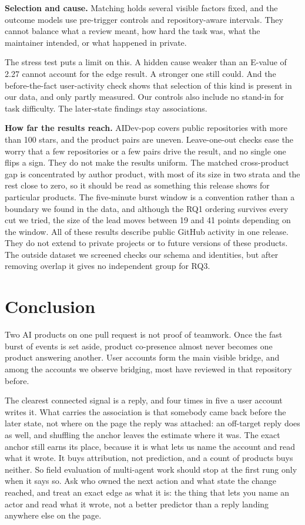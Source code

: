\documentclass[lineno,pdflatex,sn-basic]{sn-jnl}
\begin{document}
\textbf{Selection and cause.} Matching holds several visible factors fixed, and
the outcome models use pre-trigger controls and repository-aware intervals.
They cannot balance what a review meant, how hard the task was, what the
maintainer intended, or what happened in private.

The stress test puts a limit on this. A hidden cause weaker than an E-value of
2.27 cannot account for the edge result. A stronger one still could. And the
before-the-fact user-activity check shows that selection of this kind is
present in our data, and only partly measured. Our controls also include no
stand-in for task difficulty. The later-state findings stay associations.

\textbf{How far the results reach.} AIDev-pop covers public repositories with
more than 100 stars, and the product pairs are uneven. Leave-one-out checks ease
the worry that a few repositories or a few pairs drive the result, and no single
one flips a sign. They do not make the results uniform. The matched cross-product
gap is concentrated by author product, with most of its size in two strata and the
rest close to zero, so it should be read as something this release shows for
particular products. The five-minute burst window is a convention rather than a
boundary we found in the data, and although the RQ1 ordering survives every cut we
tried, the size of the lead moves between 19 and 41 points depending on the
window. All of these results describe public GitHub activity in one release. They
do not extend to private projects or to future versions of these products. The
outside dataset we screened checks our schema and identities, but after
removing overlap it gives no independent group for RQ3.

\section{Conclusion}\label{sec:conclusion}

Two AI products on one pull request is not proof of teamwork. Once the fast
burst of events is set aside, product co-presence almost never becomes one
product answering another. User accounts form the main visible bridge, and among the accounts we observe
bridging, most have reviewed in that repository before.

The clearest connected signal is a reply, and four times in five a user account
writes it. What carries the association is that somebody came back before the
later state, not where on the page the reply was attached: an off-target reply
does as well, and shuffling the anchor leaves the estimate where it was. The
exact anchor still earns its place, because it is what lets us name the account
and read what it wrote. It buys attribution, not prediction, and a count of
products buys neither. So field evaluation of multi-agent work should stop at
the first rung only when it says so. Ask who owned the next action and what state
the change reached, and treat an exact edge as what it is: the thing that lets you
name an actor and read what it wrote, not a better predictor than a reply landing
anywhere else on the page.
\end{document}
